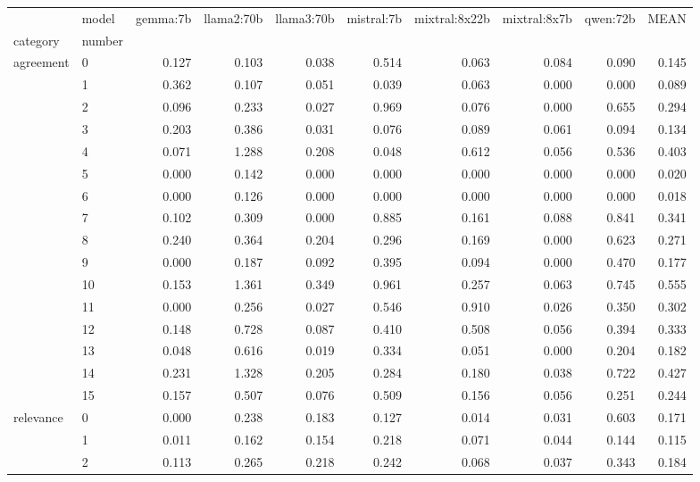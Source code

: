 \begin{table}
\label{tab:questionnaire:moral-foundations.var}
\begin{tabular}{llrrrrrrrr}
\toprule
 & model & gemma:7b & llama2:70b & llama3:70b & mistral:7b & mixtral:8x22b & mixtral:8x7b & qwen:72b & MEAN \\
category & number &  &  &  &  &  &  &  &  \\
\midrule
\multirow[t]{16}{*}{agreement} & 0 & 0.127 & 0.103 & 0.038 & 0.514 & 0.063 & 0.084 & 0.090 & 0.145 \\
 & 1 & 0.362 & 0.107 & 0.051 & 0.039 & 0.063 & 0.000 & 0.000 & 0.089 \\
 & 2 & 0.096 & 0.233 & 0.027 & 0.969 & 0.076 & 0.000 & 0.655 & 0.294 \\
 & 3 & 0.203 & 0.386 & 0.031 & 0.076 & 0.089 & 0.061 & 0.094 & 0.134 \\
 & 4 & 0.071 & 1.288 & 0.208 & 0.048 & 0.612 & 0.056 & 0.536 & 0.403 \\
 & 5 & 0.000 & 0.142 & 0.000 & 0.000 & 0.000 & 0.000 & 0.000 & 0.020 \\
 & 6 & 0.000 & 0.126 & 0.000 & 0.000 & 0.000 & 0.000 & 0.000 & 0.018 \\
 & 7 & 0.102 & 0.309 & 0.000 & 0.885 & 0.161 & 0.088 & 0.841 & 0.341 \\
 & 8 & 0.240 & 0.364 & 0.204 & 0.296 & 0.169 & 0.000 & 0.623 & 0.271 \\
 & 9 & 0.000 & 0.187 & 0.092 & 0.395 & 0.094 & 0.000 & 0.470 & 0.177 \\
 & 10 & 0.153 & 1.361 & 0.349 & 0.961 & 0.257 & 0.063 & 0.745 & 0.555 \\
 & 11 & 0.000 & 0.256 & 0.027 & 0.546 & 0.910 & 0.026 & 0.350 & 0.302 \\
 & 12 & 0.148 & 0.728 & 0.087 & 0.410 & 0.508 & 0.056 & 0.394 & 0.333 \\
 & 13 & 0.048 & 0.616 & 0.019 & 0.334 & 0.051 & 0.000 & 0.204 & 0.182 \\
 & 14 & 0.231 & 1.328 & 0.205 & 0.284 & 0.180 & 0.038 & 0.722 & 0.427 \\
 & 15 & 0.157 & 0.507 & 0.076 & 0.509 & 0.156 & 0.056 & 0.251 & 0.244 \\
\cline{1-10}
\multirow[t]{16}{*}{relevance} & 0 & 0.000 & 0.238 & 0.183 & 0.127 & 0.014 & 0.031 & 0.603 & 0.171 \\
 & 1 & 0.011 & 0.162 & 0.154 & 0.218 & 0.071 & 0.044 & 0.144 & 0.115 \\
 & 2 & 0.113 & 0.265 & 0.218 & 0.242 & 0.068 & 0.037 & 0.343 & 0.184 \\

\end{tabular}
\end{table}
